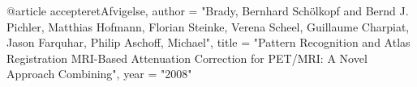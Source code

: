@article{ accepteretAfvigelse,
       author = "Brady, Bernhard Schölkopf and Bernd J. Pichler, Matthias Hofmann, Florian Steinke, Verena Scheel, Guillaume Charpiat, Jason Farquhar, Philip Aschoff, Michael",
       title = "Pattern Recognition and Atlas Registration MRI-Based Attenuation Correction for PET/MRI: A Novel Approach Combining",
       year = "2008" }